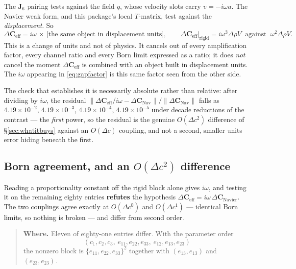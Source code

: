 \documentclass[11pt,a4paper]{article}
\newcommand{\dC}{\Delta\mathbf{C}}
\newcommand{\dCeff}{\Delta\mathbf{C}_{\mathrm{eff}}}
\newcommand{\dCnav}{\Delta\mathbf{C}_{\mathrm{Nav}}}
\newcommand{\Jsix}{\mathbf{J}_{6}}
\begin{document}
The $\Jsix$ pairing tests against the field $q$, whose velocity slots carry
$v = -i\omega u$.  The Navier weak form, and this package's local $T$-matrix,
test against the \emph{displacement}.  So
\begin{equation}\label{eq:units}
  \dCeff = i\omega\,\times\,\bigl[\text{the same object in displacement units}\bigr],
  \qquad
  \dCeff\big|_{\text{rigid}} = i\omega^3\Delta\rho V
  \;\;\text{against}\;\;
  \omega^2\Delta\rho V .
\end{equation}
This is a change of units and not of physics.  It cancels out of every
amplification factor, every channel ratio and every Born limit expressed as a
ratio; it does \emph{not} cancel the moment $\dCeff$ is combined with an object
built in displacement units.  The $i\omega$ appearing in \eqref{eq:gapfactor} is
this same factor seen from the other side.

The check that establishes it is necessarily absolute rather than relative:
after dividing by $i\omega$, the residual $\|\dCeff/i\omega - \dCnav\|/\|\dCnav\|$
falls as $4.19\times10^{-2}$, $4.19\times10^{-3}$, $4.19\times10^{-4}$,
$4.19\times10^{-5}$ under decade reductions of the contrast --- the \emph{first}
power, so the residual is the genuine $O(\Delta c^2)$ difference of
\S\ref{sec:whatitbuys} against an $O(\Delta c)$ coupling, and not a second,
smaller units error hiding beneath the first.

\subsection{Born agreement, and an \texorpdfstring{$O(\Delta c^2)$}{O(Dc2)} difference}

Reading a proportionality constant off the rigid block alone gives $i\omega$,
and testing it on the remaining eighty entries \textbf{refutes} the hypothesis
$\dCeff = i\omega\,\dC_{\text{Navier}}$.  The two couplings agree exactly at
$O(\Delta c^{0})$ and $O(\Delta c^{1})$ --- identical Born limits, so nothing is
broken --- and differ from second order.

\begin{quote}
\textbf{Where.}  Eleven of eighty-one entries differ.  With the parameter order
\[
  (c_1,c_2,c_3,\ e_{11},e_{22},e_{33},\ e_{12},e_{13},e_{23})
\]
the nonzero block is $\{e_{11},e_{22},e_{33}\}^{2}$ together with
$(e_{13},e_{13})$ and $(e_{23},e_{23})$.
\end{quote}
\end{document}
